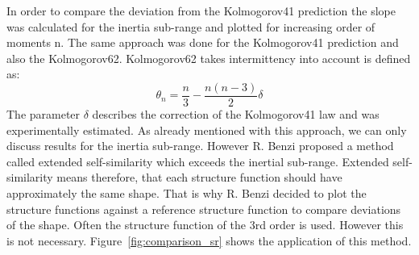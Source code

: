 \documentclass[12pt]{article}
\begin{document}
In order to compare the deviation from the Kolmogorov41 prediction the slope was calculated for the inertia sub-range and plotted for increasing order of moments n. The same approach was done for the Kolmogorov41 prediction and also the Kolmogorov62. Kolmogorov62 takes intermittency into account is defined as:
\begin{equation}
\theta_n = \frac{n}{3} - \frac{n(n-3)}{2}\delta
\end{equation}
The parameter $\delta$ describes the correction of the Kolmogorov41 law and was experimentally estimated. As already mentioned with this approach, we can only discuss results for the inertia sub-range. However R. Benzi proposed a method called extended self-similarity which exceeds the inertial sub-range. Extended self-similarity means therefore, that each structure function should have approximately the same shape. That is why R. Benzi decided to plot the structure functions against a reference structure function to compare deviations of the shape. Often the structure function of the 3rd order is used. However this is not necessary. Figure~\ref{fig:comparison_sr} shows the application of this method.
\end{document}
